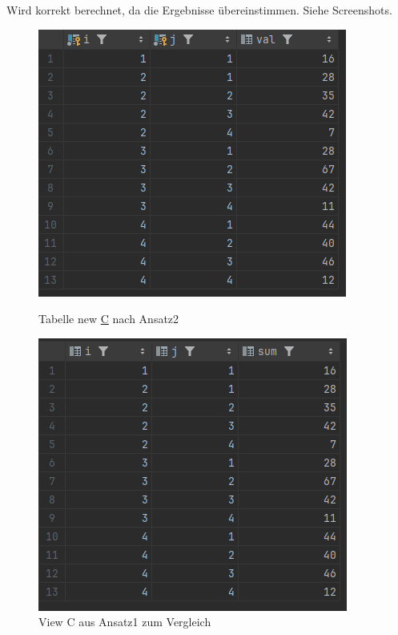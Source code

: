 \documentclass[11pt]{scrartcl}
\begin{document}
Wird korrekt berechnet, da die Ergebnisse übereinstimmen. Siehe Screenshots.
\begin{figure}[H]
  \begin{minipage}[b]{.4\linewidth}
    \begin{center}
      \includegraphics[width=\linewidth]{Tabelle_new_c.png}
      \caption{Tabelle new \underline C nach Ansatz2}
    \end{center}
  \end{minipage}
  \hspace{.1\linewidth}
  \begin{minipage}[b]{.4\linewidth}
    \begin{center}
      \includegraphics[width=\linewidth]{View_C_im_Vergleich.png}
      \caption{View C aus Ansatz1 zum Vergleich}
    \end{center}
  \end{minipage}
	\label{fig:}
\end{figure}
\end{document}
